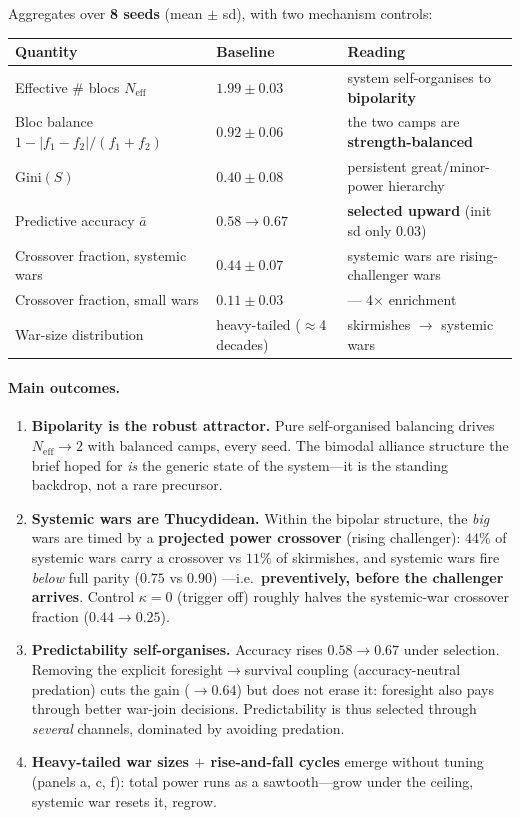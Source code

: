 \documentclass[11pt]{article}
\newcommand{\Neff}{N_{\mathrm{eff}}}
\newcommand{\abar}{\bar a}
\begin{document}
Aggregates over \textbf{8 seeds} (mean $\pm$ sd), with two mechanism controls:

\begin{table}[h]
\centering
\begin{tabular}{lll}
\toprule
Quantity & Baseline & Reading \\
\midrule
Effective \# blocs $\Neff$ & $\mathbf{1.99\pm0.03}$ & system self-organises to \textbf{bipolarity} \\
Bloc balance $1-\lvert f_1-f_2\rvert/(f_1+f_2)$ & $\mathbf{0.92\pm0.06}$ & the two camps are \textbf{strength-balanced} \\
Gini$(S)$ & $0.40\pm0.08$ & persistent great/minor-power hierarchy \\
Predictive accuracy $\abar$ & $\mathbf{0.58\to0.67}$ & \textbf{selected upward} (init sd only $0.03$) \\
Crossover fraction, systemic wars & $\mathbf{0.44\pm0.07}$ & systemic wars are rising-challenger wars \\
Crossover fraction, small wars & $\mathbf{0.11\pm0.03}$ & --- 4$\times$ enrichment \\
War-size distribution & heavy-tailed ($\approx$4 decades) & skirmishes $\to$ systemic wars \\
\bottomrule
\end{tabular}
\end{table}

\paragraph{Main outcomes.}
\begin{enumerate}
\item \textbf{Bipolarity is the robust attractor.} Pure self-organised balancing
  drives $\Neff\to 2$ with balanced camps, every seed. The bimodal alliance
  structure the brief hoped for \emph{is} the generic state of the system---it is
  the standing backdrop, not a rare precursor.
\item \textbf{Systemic wars are Thucydidean.} Within the bipolar structure, the
  \emph{big} wars are timed by a \textbf{projected power crossover} (rising
  challenger): $44\%$ of systemic wars carry a crossover vs $11\%$ of
  skirmishes, and systemic wars fire \emph{below} full parity ($0.75$ vs $0.90$)
  ---i.e.\ \textbf{preventively, before the challenger arrives}. Control
  $\kappa=0$ (trigger off) roughly halves the systemic-war crossover fraction
  ($0.44\to0.25$).
\item \textbf{Predictability self-organises.} Accuracy rises $0.58\to0.67$ under
  selection. Removing the explicit foresight$\to$survival coupling
  (accuracy-neutral predation) cuts the gain ($\to0.64$) but does not erase it:
  foresight also pays through better war-join decisions. Predictability is thus
  selected through \emph{several} channels, dominated by avoiding predation.
\item \textbf{Heavy-tailed war sizes $+$ rise-and-fall cycles} emerge without
  tuning (panels a, c, f): total power runs as a sawtooth---grow under the
  ceiling, systemic war resets it, regrow.
\end{enumerate}
\end{document}
